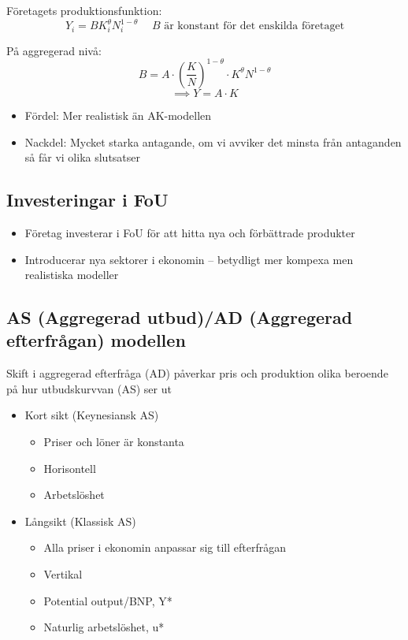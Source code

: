 \documentclass[12pt,a4paper]{article}
\begin{document}
Företagets produktionsfunktion:
$$Y_i = B K_i^{\theta} N_i^{1-\theta} \hspace{15pt} B \text{ är konstant för det enskilda företaget}$$

På aggregerad nivå:
$$B = A \cdot (\frac{K}{N})^{1-\theta} \cdot K^{\theta} N^{1-\theta}$$
$$\implies Y = A \cdot K$$

\begin{itemize}
    \item Fördel: Mer realistisk än AK-modellen
    \item Nackdel: Mycket starka antagande, om vi avviker det minsta från antaganden så får vi olika slutsatser
\end{itemize}

\subsection{Investeringar i FoU}
\begin{itemize}
    \item Företag investerar i FoU för att hitta nya och förbättrade produkter
    \item Introducerar nya sektorer i ekonomin -- betydligt mer kompexa men realistiska modeller
\end{itemize}

\newpage
\subsection{AS (Aggregerad utbud)/AD (Aggregerad efterfrågan) modellen}
Skift i aggregerad efterfråga (AD) påverkar pris och produktion
olika beroende på hur utbudskurvvan (AS) ser ut
\begin{itemize}
    \item Kort sikt (Keynesiansk AS)
    \begin{itemize}
        \item Priser och löner är konstanta 
        \item Horisontell
        \item Arbetslöshet
    \end{itemize}
    \item Långsikt (Klassisk AS)
    \begin{itemize}
        \item Alla priser i ekonomin anpassar sig till efterfrågan 
        \item Vertikal 
        \item Potential output/BNP, Y*
        \item Naturlig arbetslöshet, u*
    \end{itemize}
\end{itemize}
\end{document}
